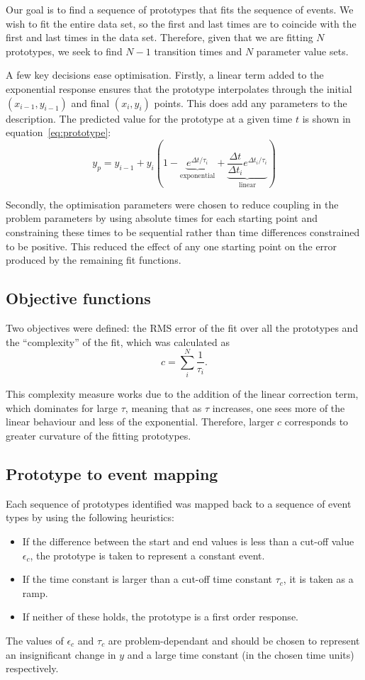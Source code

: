 Our goal is to find a sequence of prototypes that fits the sequence of
events.  We wish to fit the entire data set, so the first and last
times are to coincide with the first and last times in the data set.
Therefore, given that we are fitting $N$ prototypes, we seek to find
$N-1$ transition times and $N$ parameter value sets.

A few key decisions ease optimisation.  Firstly, a linear term 
added to the exponential response ensures that the prototype
interpolates through the initial $(x_{i-1}, y_{i-1})$ and final
$(x_{i}, y_{i})$ points.  This does add any parameters to the
description.  The predicted value for the prototype at a given time
$t$ is shown in equation~\ref{eq:prototype}:
\begin{equation}
  \label{eq:prototype}
  y_p = y_{i-1} + y_i \left (1 - \underbrace{e^{\Delta
        t/\tau_i}}_{\textrm{exponential}} + \underbrace{\frac{\Delta
        t}{\Delta t_i}e^{\Delta t_i/\tau_i}}_{\textrm{linear}} \right)
\end{equation}

Secondly, the optimisation parameters were chosen to reduce coupling
in the problem parameters by using absolute times for each starting
point and constraining these times to be sequential rather than time
differences constrained to be positive.  This reduced the effect of
any one starting point on the error produced by the remaining fit
functions.

\subsection{Objective functions}
Two objectives were defined: the RMS error of the fit over all the
prototypes and the ``complexity'' of the fit, which was calculated as
\begin{equation}
  c = \sum_i^{N} \frac{1}{\tau_i}.
\end{equation}

This complexity measure works due to the addition of the linear
correction term, which dominates for large $\tau$, meaning that as
$\tau$ increases, one sees more of the linear behaviour and less of
the exponential.  Therefore, larger $c$ corresponds to greater
curvature of the fitting prototypes.

\subsection{Prototype to event mapping}
Each sequence of prototypes identified was mapped back to a sequence
of event types by using the following heuristics:
\begin{itemize}
\item If the difference between the start and end values is less
  than a cut-off value $\epsilon_c$, the prototype is taken to
  represent a constant event.
\item If the time constant is larger than a cut-off time constant
  $\tau_c$, it is taken as a ramp.
\item If neither of these holds, the prototype is a first order response.
\end{itemize}

The values of $\epsilon_c$ and $\tau_c$ are problem-dependant and
should be chosen to represent an insignificant change in $y$ and a
large time constant (in the chosen time units) respectively.





